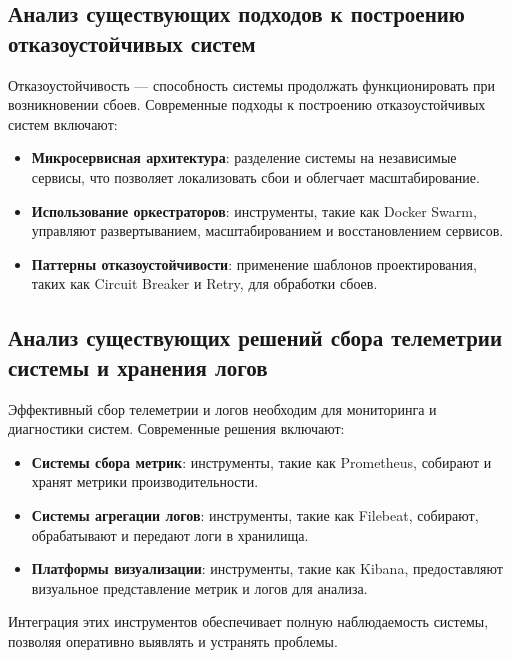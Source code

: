 \subsection{Анализ существующих подходов к построению отказоустойчивых систем}\label{subsec:anal12}
Отказоустойчивость — способность системы продолжать функционировать при возникновении сбоев.
Современные подходы к построению отказоустойчивых систем включают:
\begin{itemize}
    \item \textbf{Микросервисная архитектура}: разделение системы на независимые сервисы, что позволяет локализовать сбои и облегчает масштабирование.
    \item \textbf{Использование оркестраторов}: инструменты, такие как Docker Swarm, управляют развертыванием, масштабированием и восстановлением сервисов.
    \item \textbf{Паттерны отказоустойчивости}: применение шаблонов проектирования, таких как Circuit Breaker и Retry, для обработки сбоев.
\end{itemize}

\subsection{Анализ существующих решений сбора телеметрии системы и хранения логов}\label{subsec:anal13}
Эффективный сбор телеметрии и логов необходим для мониторинга и диагностики систем.
Современные решения включают:
\begin{itemize}
    \item \textbf{Системы сбора метрик}: инструменты, такие как Prometheus, собирают и хранят метрики производительности.
    \item \textbf{Системы агрегации логов}: инструменты, такие как Filebeat, собирают, обрабатывают и передают логи в хранилища.
    \item \textbf{Платформы визуализации}: инструменты, такие как Kibana, предоставляют визуальное представление метрик и логов для анализа.
\end{itemize}

Интеграция этих инструментов обеспечивает полную наблюдаемость системы, позволяя оперативно выявлять и устранять проблемы.

